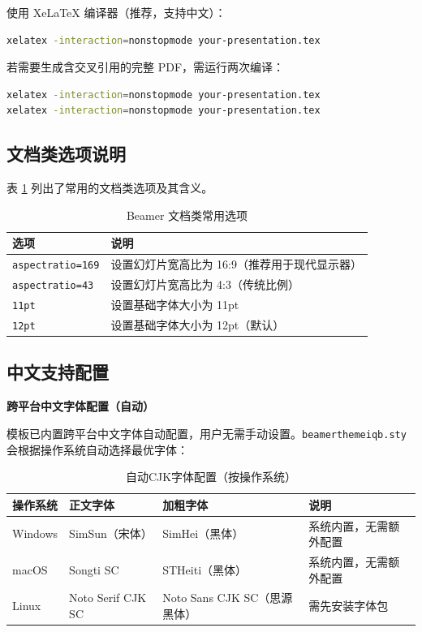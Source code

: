 使用 XeLaTeX 编译器（推荐，支持中文）：

\begin{lstlisting}[style=blockstyle,language=bash]
xelatex -interaction=nonstopmode your-presentation.tex
\end{lstlisting}

若需要生成含交叉引用的完整 PDF，需运行两次编译：

\begin{lstlisting}[style=blockstyle,language=bash]
xelatex -interaction=nonstopmode your-presentation.tex
xelatex -interaction=nonstopmode your-presentation.tex
\end{lstlisting}

\subsection{文档类选项说明}

表 \ref{tab:beamer-options} 列出了常用的文档类选项及其含义。

\begin{table}[!h]
\centering
\caption{Beamer 文档类常用选项}
\label{tab:beamer-options}
\begin{tabular}{p{3.5cm}p{9.5cm}}
\toprule
\textbf{选项} & \textbf{说明} \\
\midrule
\lstinline|aspectratio=169| & 设置幻灯片宽高比为 16:9（推荐用于现代显示器） \\
\lstinline|aspectratio=43| & 设置幻灯片宽高比为 4:3（传统比例） \\
\lstinline|11pt| & 设置基础字体大小为 11pt \\
\lstinline|12pt| & 设置基础字体大小为 12pt（默认） \\
\bottomrule
\end{tabular}
\end{table}

\subsection{中文支持配置}
\label{sec:cjk}

\textbf{跨平台中文字体配置（自动）}

模板已内置跨平台中文字体自动配置，用户无需手动设置。\lstinline|beamerthemeiqb.sty| 会根据操作系统自动选择最优字体：

\begin{table}[!h]
\centering
\caption{自动CJK字体配置（按操作系统）}
\label{tab:cjk-fonts-theme}
\begin{tabular}{p{2cm}p{3cm}p{3cm}p{3cm}}
\toprule
\textbf{操作系统} & \textbf{正文字体} & \textbf{加粗字体} & \textbf{说明} \\
\midrule
Windows & SimSun（宋体） & SimHei（黑体） & 系统内置，无需额外配置 \\
macOS & Songti SC & STHeiti（黑体） & 系统内置，无需额外配置 \\
Linux & Noto Serif CJK SC & Noto Sans CJK SC（思源黑体） & 需先安装字体包 \\
\bottomrule
\end{tabular}
\end{table}

